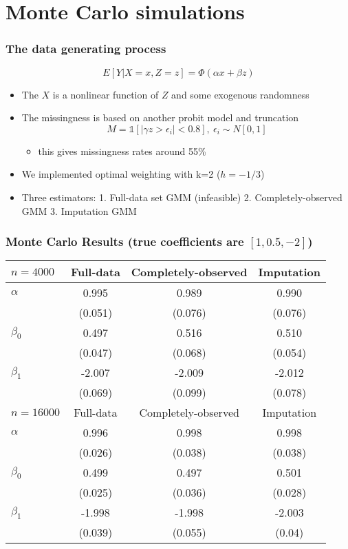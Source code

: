 \documentclass[compress,mathserif]{beamer}
\newcommand{\ind}{\mathds{1}}
\begin{document}
\section{Monte Carlo simulations}\hypertarget{Monte Carlo simulations}{}


\begin{frame}\frametitle{The data generating process}\hypertarget{The data generating process}{}
\[E[Y|X=x, Z=z]= \Phi(\alpha x + \beta z)
\]
\begin{itemize}
\item The $X$ is a nonlinear function of $Z$ and some exogenous randomness

\item The missingness is based on another probit model and truncation
\[M= \ind[|\gamma z>\epsilon_i|<0.8], \ \epsilon_i\sim N[0,1]
\]
\begin{itemize}
\item this gives missingness rates around 55\%
\end{itemize}

\item We implemented optimal weighting with k=2 ($h=-1/3$)
\item Three estimators: 1. Full-data set GMM (infeasible) 2. Completely-observed GMM 3. Imputation GMM

\end{itemize}
\end{frame}



\begin{frame}\frametitle{Monte Carlo Results (true coefficients are $[1, 0.5, -2]$)}\hypertarget{Monte Carlo Results (true coefficients are $[1, 0.5, -2]$)}{}

\begin{table}
	\begin{tabular}{l|c|c|c}
	$n=4000$ & Full-data & Completely-observed & Imputation \\
\hline
\hline
$\alpha$ & 0.995 & 0.989 & 0.990 \\
& (0.051) & (0.076) & (0.076) \\
\hline
$\beta_0$ & 0.497  & 0.516 & 0.510 \\
& (0.047) & (0.068) & (0.054) \\
\hline
$\beta_1$ & -2.007 & -2.009 & -2.012  \\
& (0.069) & (0.099) & (0.078) \\
\hline
\hline
	$n=16000$ & Full-data & Completely-observed & Imputation \\
\hline
\hline
$\alpha$ & 0.996 & 0.998 & 0.998 \\
& (0.026) & (0.038) & (0.038) \\
\hline
$\beta_0$ & 0.499 & 0.497 & 0.501 \\
& (0.025) & (0.036) & (0.028) \\
\hline
$\beta_1$ & -1.998 & -1.998 & -2.003 \\
& (0.039) & (0.055) & (0.04) \\
\hline
\hline
	\end{tabular}
\end{table}
\end{frame}
\end{document}
